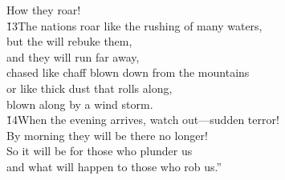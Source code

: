 \begin{poetry}
\poemll    How they roar! \\
\poeml \v{13}The nations roar like the rushing of many waters, \\
\poemll    but the  will rebuke them, \\
\poeml and they will run far away, \\
\poemll    chased like chaff blown down from the mountains \\
\poeml or like thick dust that rolls along, \\
\poemll    blown along by a wind storm. \\
\poeml \v{14}When the evening arrives, watch out---sudden terror! \\
\poemll    By morning they will be there no longer! \\
\poeml So it will be for those who plunder us \\
\poemll    and what will happen to those who rob us.''
\end{poetry}

